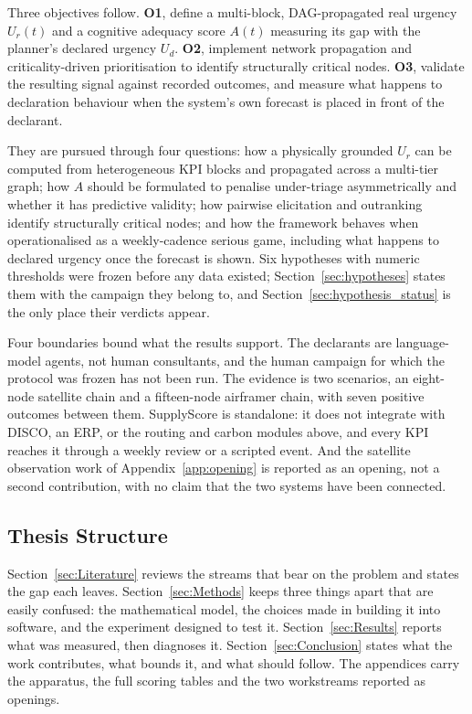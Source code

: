 Three objectives follow. \textbf{O1}, define a multi-block, DAG-propagated real urgency
$U_r(t)$ and a cognitive adequacy score $A(t)$ measuring its gap with the planner's declared
urgency $U_d$. \textbf{O2}, implement network propagation and criticality-driven
prioritisation to identify structurally critical nodes. \textbf{O3}, validate the resulting
signal against recorded outcomes, and measure what happens to declaration behaviour when the
system's own forecast is placed in front of the declarant.

They are pursued through four questions: how a physically grounded $U_r$ can be computed from
heterogeneous KPI blocks and propagated across a multi-tier graph; how $A$ should be
formulated to penalise under-triage asymmetrically and whether it has predictive validity;
how pairwise elicitation and outranking identify structurally critical nodes; and how the
framework behaves when operationalised as a weekly-cadence serious game, including what
happens to declared urgency once the forecast is shown. Six hypotheses with numeric
thresholds were frozen before any data existed; Section~\ref{sec:hypotheses} states them with
the campaign they belong to, and Section~\ref{sec:hypothesis_status} is the only place their
verdicts appear.

Four boundaries bound what the results support. The declarants are language-model agents, not
human consultants, and the human campaign for which the protocol was frozen has not been run.
The evidence is two scenarios, an eight-node satellite chain and a fifteen-node airframer
chain, with seven positive outcomes between them. SupplyScore is standalone: it does not
integrate with DISCO, an ERP, or the routing and carbon modules above, and every KPI reaches
it through a weekly review or a scripted event. And the satellite observation work of
Appendix~\ref{app:opening} is reported as an opening, not a second contribution, with no
claim that the two systems have been connected.

\subsection{Thesis Structure}
\label{sec:intro_structure}

Section~\ref{sec:Literature} reviews the streams that bear on the problem and states the gap
each leaves. Section~\ref{sec:Methods} keeps three things apart that are easily confused: the
mathematical model, the choices made in building it into software, and the experiment designed
to test it. Section~\ref{sec:Results} reports what was measured, then diagnoses it.
Section~\ref{sec:Conclusion} states what the work contributes, what bounds it, and what should
follow. The appendices carry the apparatus, the full scoring tables and the two workstreams
reported as openings.
